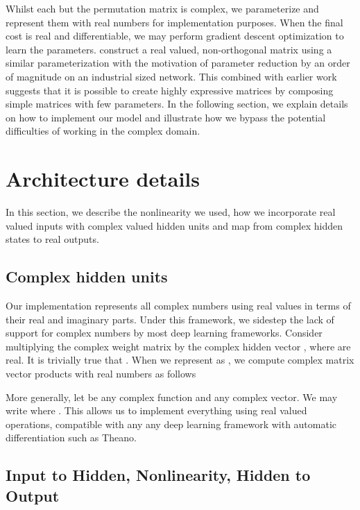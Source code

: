 \documentclass{article}
\begin{document}
\vspace{-0.5mm}
Whilst each but the permutation matrix is complex, we parameterize and represent them with real numbers
for implementation purposes. When the final cost is real and differentiable, we may perform gradient descent 
optimization to learn the parameters.
\cite{dfc} construct a real valued, non-orthogonal matrix using a similar parameterization with the motivation
of parameter reduction by an order of magnitude on an industrial sized network. This combined with earlier
work \citep{fastfood} suggests that it is possible to create highly expressive matrices by composing simple
matrices with few parameters. In the following section, we explain details on how to implement our model 
and illustrate how we bypass the
potential difficulties of working in the complex domain.

\section{Architecture details}
\label{sec:impl}
\vspace{-0.1mm}
In this section, we describe the nonlinearity we used, how we incorporate real valued inputs 
with complex valued hidden units and map from complex hidden states to real outputs. 
\vspace{-0.1mm}
\subsection{Complex hidden units}
\vspace{-0.1mm}
Our implementation represents all complex numbers using real values in terms of their
real and imaginary parts. Under this framework, we sidestep the lack of support for complex numbers 
by most deep learning frameworks. Consider multiplying the complex weight matrix 
 by the complex hidden vector , where
 are real.
It is trivially true that .
When we represent  as  , we
compute complex matrix vector products with real numbers as follows
\vspace{-0.2mm}


More generally, let  be any complex function and  
any complex vector. We may write  where 
. 
This allows us to implement everything using real valued operations, compatible with any
any deep learning framework with automatic differentiation such as Theano.

\subsection{Input to Hidden, Nonlinearity, Hidden to Output}
\end{document}
